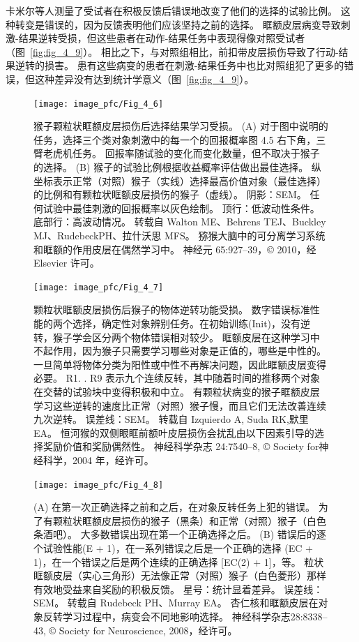 卡米尔等人测量了受试者在积极反馈后错误地改变了他们的选择的试验比例。
这种转变是错误的，因为反馈表明他们应该坚持之前的选择。
眶额皮层病变导致刺激-结果逆转受损，但这些患者在动作-结果任务中表现得像对照受试者（图~\ref{fig:fig_4_9}）。
相比之下，与对照组相比，前扣带皮层损伤导致了行动-结果逆转的损害。
患有这些病变的患者在刺激-结果任务中也比对照组犯了更多的错误，但这种差异没有达到统计学意义（图~\ref{fig:fig_4_9}）。\par


\begin{figure}[!htb]
	\centering
	\texttt{[image: image\_pfc/Fig\_4\_6]}
	\caption{猴子颗粒状眶额皮层损伤后选择结果学习受损。
		(A) 对于图中说明的任务，选择三个类对象刺激中的每一个的回报概率图 4.5 右下角，三臂老虎机任务。
		回报率随试验的变化而变化数量，但不取决于猴子的选择。
		(B) 猴子的试验比例根据收益概率评估做出最佳选择。 纵坐标表示正常（对照）猴子（实线）选择最高价值对象（最佳选择）的比例和有颗粒状眶额皮层损伤的猴子（虚线）。
		阴影：SEM。
		任何试验中最佳刺激的回报概率以灰色绘制。
		顶行：低波动性条件。
		底部行：高波动情况。
		转载自 Walton ME、Behrens TEJ、Buckley MJ、RudebeckPH、拉什沃思 MFS。
		猕猴大脑中的可分离学习系统和眶额的作用皮层在偶然学习中。
		神经元 65:927–39，© 2010，经 Elsevier 许可。}
	\label{fig:fig_4_6}
\end{figure}


\begin{figure}[!htb]
	\centering
	\texttt{[image: image\_pfc/Fig\_4\_7]}
	\caption{颗粒状眶额皮层损伤后猴子的物体逆转功能受损。
		数字错误标准性能的两个选择，确定性对象辨别任务。在初始训练(Init)，没有逆转，猴子学会区分两个物体错误相对较少。
		眶额皮层在这种学习中不起作用，因为猴子只需要学习哪些对象是正值的，哪些是中性的。
		一旦简单将物体分类为阳性或中性不再解决问题，因此眶额皮层变得必要。
		R1. . R9 表示九个连续反转，其中随着时间的推移两个对象在交替的试验块中变得积极和中立。
		有颗粒状病变的猴子眶额皮层学习这些逆转的速度比正常（对照）猴子慢，而且它们无法改善连续九次逆转。
		误差线：SEM。 
		转载自 Izquierdo A, Suda RK,默里EA。
		恒河猴的双侧眼眶前额叶皮层损伤会扰乱由以下因素引导的选择奖励价值和奖励偶然性。
		神经科学杂志 24:7540–8, © Society for神经科学，2004 年，经许可。}
	\label{fig:fig_4_7}
\end{figure}


\begin{figure}[!htb]
	\centering
	\texttt{[image: image\_pfc/Fig\_4\_8]}
	\caption{(A) 在第一次正确选择之前和之后，在对象反转任务上犯的错误。
		为了有颗粒状眶额皮层损伤的猴子（黑条）和正常（对照）猴子（白色条酒吧）。
		大多数错误出现在第一个正确选择之后。
		(B) 错误后的逐个试验性能(E + 1)，在一系列错误之后是一个正确的选择 (EC + 1)，在一个错误之后是两个连续的正确选择 [EC(2) + 1]，等。
		粒状眶额皮层（实心三角形）无法像正常（对照）猴子（白色菱形）那样有效地受益来自奖励的积极反馈。
		星号：统计显着差异。
		误差线：SEM。
		转载自 Rudebeck PH、Murray EA。 杏仁核和眶额皮层在对象反转学习过程中，病变会不同地影响选择。
		神经科学杂志28:8338–43, © Society for Neuroscience, 2008，经许可。}
	\label{fig:fig_4_8}
\end{figure}


